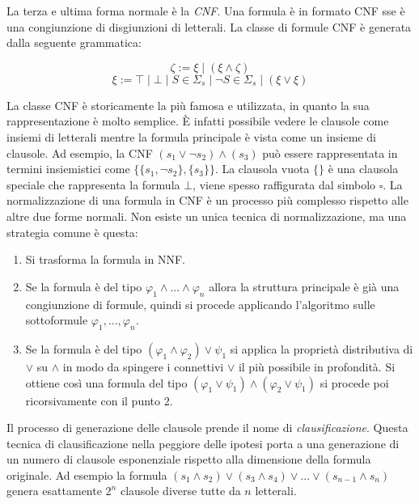 \documentclass[./main.tex]{subfiles}
\begin{document}
La terza e ultima forma normale è la \textit{CNF}. Una formula è in formato CNF
sse è una congiunzione di disgiunzioni di letterali. La classe di formule CNF è generata dalla seguente grammatica:


$$ \zeta := \xi \mid (\xi \land \zeta) $$
$$ \xi := \top \mid \bot \mid S \in \Sigma_s \mid \lnot S \in \Sigma_s \mid (\xi \lor \xi ) $$

La classe CNF è storicamente la più famosa e utilizzata, in quanto la sua rappresentazione è molto semplice.
È infatti possibile vedere le clausole come insiemi di letterali mentre la 
formula principale è vista come un insieme di clausole. 
Ad esempio, la CNF $(s_1 \lor \lnot s_2) \land (s_3)$ può essere rappresentata
in termini insiemistici come $\{\{s_1, \lnot s_2\}, \{s_3\}\}$. 
La clausola vuota $\{\}$ è una clausola speciale che rappresenta la formula $\bot$, viene spesso raffigurata dal simbolo $\square$.
La normalizzazione di una formula in CNF è un processo più complesso rispetto alle altre due forme normali. Non esiste un unica tecnica di normalizzazione, ma
una strategia comune è questa:
\begin{enumerate}
  \item Si trasforma la formula in NNF.
  \item Se la formula è del tipo $\varphi_1 \land ... \land \varphi_n$ allora la struttura principale è già una congiunzione di formule,
   quindi si procede applicando l'algoritmo sulle sottoformule $\varphi_1, ..., \varphi_n$.
  \item Se la formula è del tipo $(\varphi_1 \land \varphi_2) \lor \psi_1$ si applica la proprietà distributiva di $\lor$ su $\land$ in 
  modo da spingere i connettivi $\lor$ il più possibile in profondità. Si ottiene così una formula del tipo
  $(\varphi_1 \lor \psi_1) \land (\varphi_2 \lor \psi_1)$ si procede poi ricorsivamente con il punto 2.
\end{enumerate}

Il processo di generazione delle clausole prende il nome di \textit{clausificazione}.
Questa tecnica di clausificazione nella peggiore delle ipotesi porta a una generazione di un numero di clausole esponenziale 
rispetto alla dimensione della formula originale. Ad esempio la formula $(s_1 \land s_2) \lor (s_3 \land s_4) \lor ... \lor (s_{n-1} \land s_{n})$ 
genera esattamente $2^{n}$ clausole diverse tutte da $n$ letterali.



\end{document}
